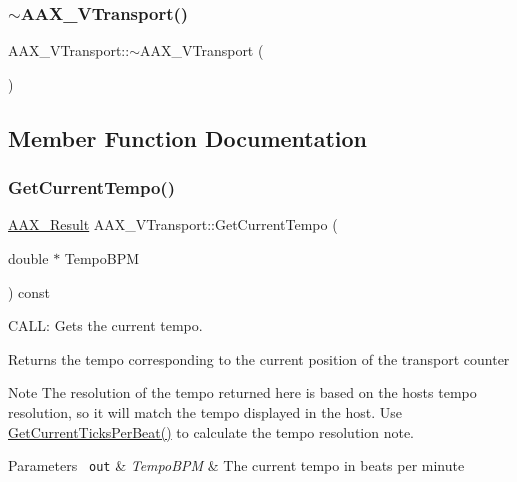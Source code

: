 \subsubsection{\texorpdfstring{$\sim$AAX\_VTransport()}{~AAX\_VTransport()}}
{\footnotesize\ttfamily A\+A\+X\+\_\+\+V\+Transport\+::$\sim$\+A\+A\+X\+\_\+\+V\+Transport (\begin{DoxyParamCaption}{ }\end{DoxyParamCaption})}



\subsection{Member Function Documentation}
\mbox{\label{a01941_a611d5261c674060c1ba90e4e8b0c02f2}} 
\subsubsection{\texorpdfstring{GetCurrentTempo()}{GetCurrentTempo()}}
{\footnotesize\ttfamily \mbox{\hyperlink{a00392_a4d8f69a697df7f70c3a8e9b8ee130d2f}{A\+A\+X\+\_\+\+Result}} A\+A\+X\+\_\+\+V\+Transport\+::\+Get\+Current\+Tempo (\begin{DoxyParamCaption}\item[{double $\ast$}]{Tempo\+B\+PM }\end{DoxyParamCaption}) const\hspace{0.3cm}{\ttfamily [virtual]}}



C\+A\+LL\+: Gets the current tempo. 

Returns the tempo corresponding to the current position of the transport counter

\begin{DoxyNote}{Note}
The resolution of the tempo returned here is based on the host\textquotesingle{}s tempo resolution, so it will match the tempo displayed in the host. Use \mbox{\hyperlink{a01885_aa5cfd6fef3e4950583ec1e050be692ec}{Get\+Current\+Ticks\+Per\+Beat()}} to calculate the tempo resolution note.
\end{DoxyNote}

\begin{DoxyParams}[1]{Parameters}
\mbox{\texttt{ out}}  & {\em Tempo\+B\+PM} & The current tempo in beats per minute \\
\hline
\end{DoxyParams}


